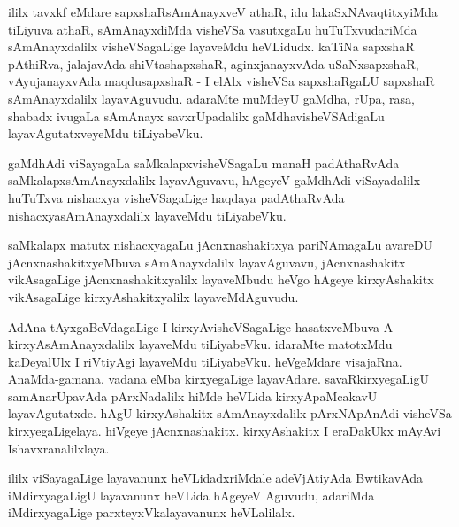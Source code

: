 \begin{artha}
ililx tavxkf eMdare sapxshaRsAmAnayxveV athaR, idu lakaSxNAvaqtitxyiMda tiLiyuva athaR, sAmAnayxdiMda visheVSa vasutxgaLu
huTuTxvudariMda sAmAnayxdalilx visheVSagaLige layaveMdu heVLidudx.
kaTiNa sapxshaR pAthiRva, jalajavAda shiVtashapxshaR, aginxjanayxvAda
uSaNxsapxshaR, vAyujanayxvAda maqdusapxshaR - I elAlx visheVSa
sapxshaRgaLU sapxshaR sAmAnayxdalilx layavAguvudu. adaraMte muMdeyU
gaMdha, rUpa, rasa, shabadx ivugaLa sAmAnayx savxrUpadalilx
gaMdhavisheVSAdigaLu layavAgutatxveyeMdu tiLiyabeVku.
\end{artha}

\begin{artha}
gaMdhAdi viSayagaLa saMkalapxvisheVSagaLu manaH padAthaRvAda
saMkalapxsAmAnayxdalilx layavAguvavu, hAgeyeV gaMdhAdi viSayadalilx
huTuTxva nishacxya visheVSagaLige haqdaya padAthaRvAda
nishacxyasAmAnayxdalilx layaveMdu tiLiyabeVku.
\end{artha}

\begin{artha}
saMkalapx matutx nishacxyagaLu jAcnxnashakitxya pariNAmagaLu avareDU
jAcnxnashakitxyeMbuva sAmAnayxdalilx layavAguvavu, jAcnxnashakitx
vikAsagaLige jAcnxnashakitxyalilx layaveMbudu heVgo hAgeye
kirxyAshakitx vikAsagaLige kirxyAshakitxyalilx layaveMdAguvudu.
\end{artha}

\begin{artha}
AdAna tAyxgaBeVdagaLige I kirxyAvisheVSagaLige hasatxveMbuva A
kirxyAsAmAnayxdalilx layaveMdu tiLiyabeVku. idaraMte matotxMdu
kaDeyalUlx I riVtiyAgi layaveMdu tiLiyabeVku. heVgeMdare
visajaRna. AnaMda-gamana. vadana eMba kirxyegaLige
layavAdare. savaRkirxyegaLigU samAnarUpavAda pArxNadalilx hiMde heVLida kirxyApaMcakavU layavAgutatxde. hAgU
kirxyAshakitx sAmAnayxdalilx pArxNApAnAdi visheVSa
kirxyegaLigelaya. hiVgeye jAcnxnashakitx. kirxyAshakitx I eraDakUkx
mAyAvi Ishavxranalilxlaya.

ililx viSayagaLige layavanunx heVLidadxriMdale adeVjAtiyAda
BwtikavAda iMdirxyagaLigU layavanunx heVLida hAgeyeV Aguvudu, adariMda
iMdirxyagaLige parxteyxVkalayavanunx heVLalilalx.
\end{artha}

